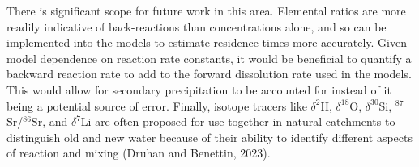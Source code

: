 \bsk

There is significant scope for future work in this area. Elemental ratios are more readily indicative of back-reactions than concentrations alone, and so can be implemented into the models to estimate residence times more accurately. Given model dependence on reaction rate constants, it would be beneficial to quantify a backward reaction rate to add to the forward dissolution rate used in the models. This would allow for secondary precipitation to be accounted for instead of it being a potential source of error. Finally, isotope tracers like $\delta^2$H, $\delta^{18}$O, $\delta^{30}$Si, $^{87}$Sr/$^{86}$Sr, and $\delta^7$Li are often proposed for use together in natural catchments to distinguish old and new water because of their ability to identify different aspects of reaction and mixing (Druhan and Benettin, 2023). 
















